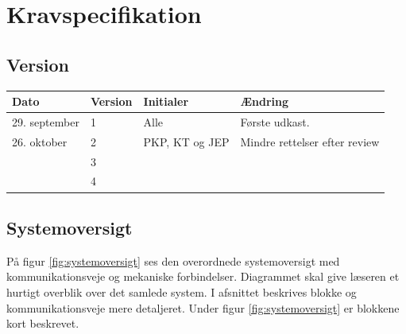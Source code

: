 \chapter{Kravspecifikation} \label{ch:kravspecifikation}
\section*{Version}
\begin{table}[h]
	\centering
	\begin{tabularx}{\textwidth - 2cm}{|l|l|l|X|}
	\hline
	Dato			& Version			& Initialer 		& Ændring										\\ \hline
	29. september 	& 1 				& Alle				& Første udkast. 								\\ \hline
	26. oktober		& 2 				& PKP, KT og JEP	& Mindre rettelser efter review						 						\\ \hline
			 		& 3 				&  					& 												\\ \hline
					& 4 				&  					& 												\\ \hline
	\end{tabularx}
\end{table}
\clearpage



\section{Systemoversigt} \label{sec:systemoversigt}
På figur \ref{fig:systemoversigt} ses den overordnede systemoversigt med kommunikationsveje og mekaniske forbindelser. Diagrammet skal give læseren et hurtigt overblik over det samlede system. I afsnittet %
beskrives blokke og kommunikationsveje mere detaljeret. Under figur \ref{fig:systemoversigt} er blokkene kort beskrevet. 

